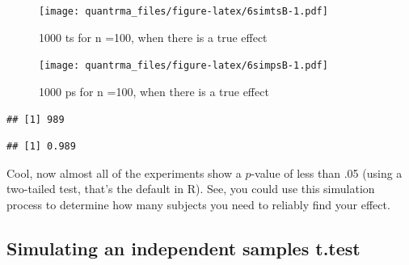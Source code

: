 \documentclass[
]{book}
\newenvironment{Shaded}{\begin{snugshade}}{\end{snugshade}}
\newcommand{\ControlFlowTok}[1]{\textcolor[rgb]{0.13,0.29,0.53}{\textbf{#1}}}
\newcommand{\DataTypeTok}[1]{\textcolor[rgb]{0.13,0.29,0.53}{#1}}
\newcommand{\DecValTok}[1]{\textcolor[rgb]{0.00,0.00,0.81}{#1}}
\newcommand{\KeywordTok}[1]{\textcolor[rgb]{0.13,0.29,0.53}{\textbf{#1}}}
\newcommand{\NormalTok}[1]{#1}
\newcommand{\OperatorTok}[1]{\textcolor[rgb]{0.81,0.36,0.00}{\textbf{#1}}}
\newcommand{\StringTok}[1]{\textcolor[rgb]{0.31,0.60,0.02}{#1}}
\begin{document}
\begin{Shaded}
\end{Shaded}

\begin{figure}
\centering
\texttt{[image: quantrma\_files/figure-latex/6simtsB-1.pdf]}
\caption{\label{fig:6simtsB}1000 ts for n =100, when there is a true effect}
\end{figure}

\begin{figure}
\centering
\texttt{[image: quantrma\_files/figure-latex/6simpsB-1.pdf]}
\caption{\label{fig:6simpsB}1000 ps for n =100, when there is a true effect}
\end{figure}

\begin{verbatim}
## [1] 989
\end{verbatim}

\begin{verbatim}
## [1] 0.989
\end{verbatim}

Cool, now almost all of the experiments show a \(p\)-value of less than .05 (using a two-tailed test, that's the default in R). See, you could use this simulation process to determine how many subjects you need to reliably find your effect.

\hypertarget{simulating-an-independent-samples-t.test}{%
\subsection{Simulating an independent samples t.test}\label{simulating-an-independent-samples-t.test}}
\end{document}
